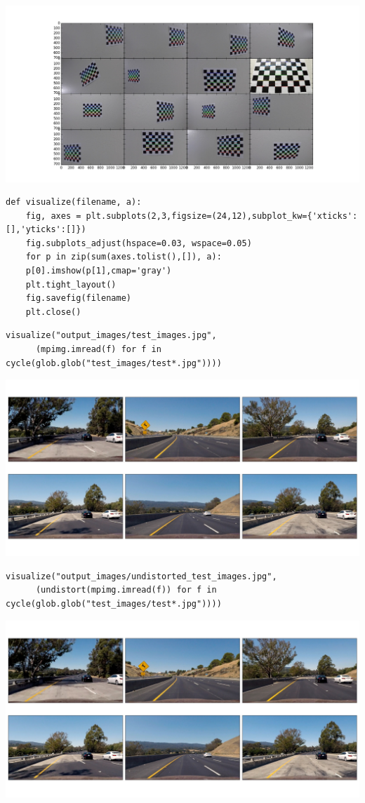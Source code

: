 \documentclass[11pt]{article}
\begin{document}
\includegraphics[width=.9\linewidth]{output_images/annotated_calibration_images.jpg}

\begin{verbatim}
def visualize(filename, a):
    fig, axes = plt.subplots(2,3,figsize=(24,12),subplot_kw={'xticks':[],'yticks':[]})
    fig.subplots_adjust(hspace=0.03, wspace=0.05)
    for p in zip(sum(axes.tolist(),[]), a):
	p[0].imshow(p[1],cmap='gray')
    plt.tight_layout()
    fig.savefig(filename)
    plt.close()
\end{verbatim}

\begin{verbatim}
visualize("output_images/test_images.jpg",
	  (mpimg.imread(f) for f in cycle(glob.glob("test_images/test*.jpg"))))
\end{verbatim}

\includegraphics[width=.9\linewidth]{output_images/test_images.jpg}

\begin{verbatim}
visualize("output_images/undistorted_test_images.jpg",
	  (undistort(mpimg.imread(f)) for f in cycle(glob.glob("test_images/test*.jpg"))))
\end{verbatim}

\includegraphics[width=.9\linewidth]{output_images/undistorted_test_images.jpg}
\end{document}
